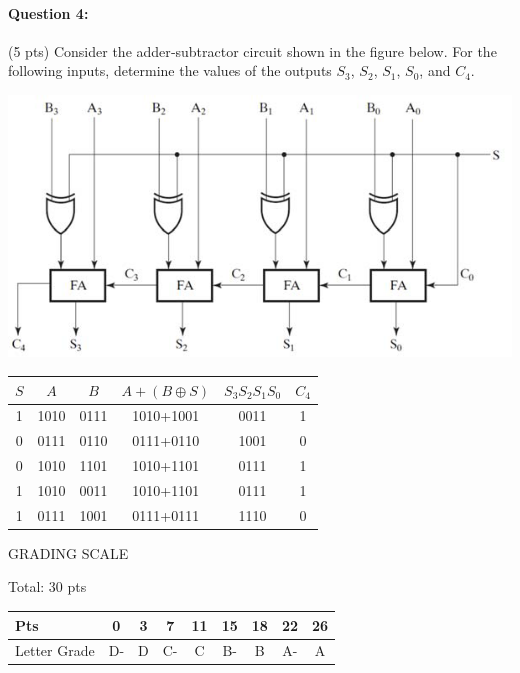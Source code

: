 \documentclass[12pt,letterpaper,titlepage]{report}
\begin{document}
\begin{raggedright}
\paragraph{Question 4:}
(5 pts) Consider the adder‐subtractor circuit shown in the figure below. For the following inputs, determine the values of the outputs $S_3$, $S_2$, $S_1$, $S_0$, and $C_4$.
\begin{center}
\includegraphics[width=\textwidth,height=0.9\textheight,keepaspectratio=true]{hw8p4}
\end{center}
\begin{center}
\def\arraystretch{1.5} 
\begin{tabular}{cccccc}\hline 
$S$ & $A$ & $B$ & $A +(B\oplus S)$ & $S_3S_2S_1S_0$ & $C_4$ \\\hline 
1 & 1010 & 0111 & 1010+1001 & 0011 & 1 \\ 
0 & 0111 & 0110 & 0111+0110 & 1001 & 0 \\ 
0 & 1010 & 1101 & 1010+1101 & 0111 & 1 \\ 
1 & 1010 & 0011 & 1010+1101 & 0111 & 1 \\ 
1 & 0111 & 1001 & 0111+0111 & 1110 & 0 \\\hline
\end{tabular}
\end{center}

\vspace{\fill}
\noindent
GRADING SCALE
\medskip

Total: 30 pts
\bigskip

\def\arraystretch{1.5} 
\begin{tabular}{ | l | c | c | c | c | c | c | c | c | } \hline
Pts          & 0  & 3  & 7  & 11 & 15 & 18 & 22 & 26     \\\hline
Letter Grade & D- & D  & C- & C  & B- & B  & A- & A      \\\hline
\end{tabular}
\end{raggedright}
\end{document}
